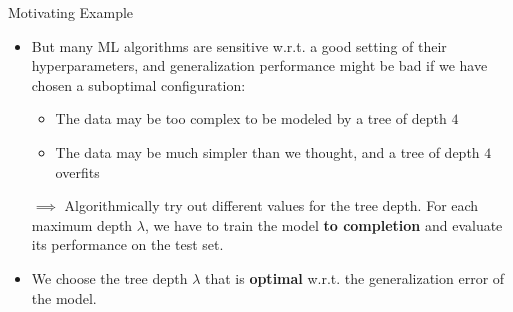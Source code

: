\begin{vbframe}{Motivating Example}
\framebreak 

\begin{itemize}
\item But many ML algorithms are sensitive w.r.t. a good setting of their hyperparameters,
  and generalization performance might be bad if we have chosen a suboptimal configuration:
\begin{itemize}
\item The data may be too complex to be modeled by a tree of depth $4$ 
\item The data may be much simpler than we thought, and a tree of depth $4$ overfits
\end{itemize}
\item[$\implies$] Algorithmically try out different values for the tree depth. For each maximum depth $\lambda$, we have to train the model \textbf{to completion} and evaluate its performance on the test set. 
\item We choose the tree depth $\lambda$ that is \textbf{optimal} w.r.t. the generalization error of the model. 
\end{itemize}


\end{vbframe}




